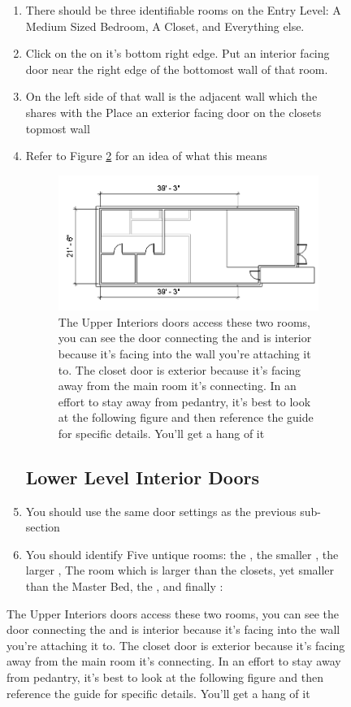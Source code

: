 \documentclass{tufte-book} %
\begin{document}
\begin{figure}
\begin{enumerate}
	\subsection{Entry Level Interior Doors}
		\item There should be three identifiable rooms on the Entry Level: A Medium Sized Bedroom, A Closet, and Everything else.
		\item Click on the  on it's bottom right edge. Put an interior facing door near the right edge of the bottomost wall of that room.
		\item On the left side of that wall is the adjacent wall which the  shares with the  Place an exterior facing door on the closets topmost wall
		\item Refer to Figure \ref{fig:revupperinterdoors} for an idea of what this means
		
		\begin{figure}
			\includegraphics[width=\linewidth]{revitupperinteriordoors.png}
			\caption[Upper Interior Doors]{The Upper Interiors doors access these two rooms, you can see the door connecting the  and  is interior because it's facing into the wall you're attaching it to. The closet door is exterior because it's facing away from the main room it's connecting. In an effort to stay away from pedantry, it's best to look at the following figure and then reference the guide for specific details. You'll get a hang of it}
			\label{fig:revupperinterdoors}
		\end{figure}
		

	\subsection{Lower Level Interior Doors}
		\item You should use the same door settings as the previous sub-section
		\item You should identify Five untique rooms: the , the smaller , the larger , The room which is larger than the closets, yet smaller than the Master Bed, the , and finally :


\end{enumerate}
\end{figure}
\end{document}
